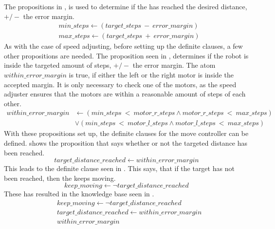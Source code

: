 The propositions in , is used to determine if the \projname{} has reached the desired distance, $+/-$ the error margin. 
\begin{equation} \label{eq:min-max-steps}
\begin{split}
& min\_steps \leftarrow (target\_steps~-~error\_margin) \\
& max\_steps \leftarrow (target\_steps~+~error\_margin)
\end{split}
\end{equation}
As with the case of speed adjusting, before setting up the definite clauses, a few other propositions are needed. The proposition seen in , determines if the robot is inside the targeted amount of steps, $+/-$ the error margin. The atom $within\_error\_margin$ is true, if either the left or the right motor is inside the accepted margin. It is only necessary to check one of the motors, as the speed adjuster ensures that the motors are within a reasonable amount of steps of each other. 
\begin{equation} \label{eq:within-error-margin}
\begin{split}
within\_error\_margin & \leftarrow (min\_steps~<~motor\_r\_steps \land motor\_r\_steps~<~max\_steps) \\
& \lor (min\_steps~<~motor\_l\_steps \land motor\_l\_steps~<~max\_steps)
\end{split}
\end{equation}
With these propositions set up, the definite clauses for the move controller can be defined.  shows the proposition that says whether or not the targeted distance has been reached. 
\begin{equation} \label{eq:target-distance-reached}
target\_distance\_reached \leftarrow within\_error\_margin
\end{equation}
This leads to the definite clause seen in . This says, that if the target has not been reached, then the \projname{} keeps moving.
\begin{equation} \label{eq:keep-moving}
keep\_moving \leftarrow \lnot target\_distance\_reached
\end{equation}
These has resulted in the knowledge base seen in . 
\begin{equation} \label{eq:knowledge-base-move-controller}
\begin{split}
& keep\_moving \leftarrow \lnot target\_distance\_reached \\
& target\_distance\_reached \leftarrow within\_error\_margin \\
& within\_error\_margin
\end{split}
\end{equation}


